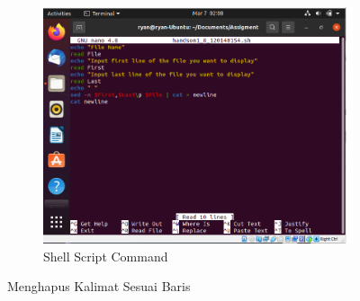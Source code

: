 \documentclass[11pt,a4paper]{article}
\begin{document}
\begin{figure}[h]
\begin{subfigure}[b]{0.4\textwidth}
		\includegraphics[width=1\textwidth]{Gambar/Assigment 8 shell.png}
		\caption{Shell Script Command}
		\label{fig:aug-2}
	\end{subfigure}
	\caption{Menghapus Kalimat Sesuai Baris}\label{fig:aug}
\end{figure}
\end{document}
